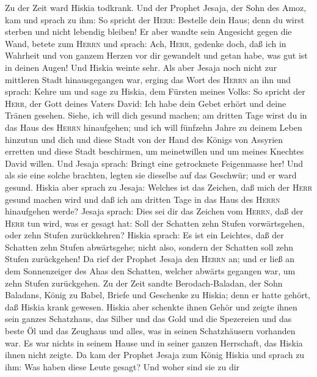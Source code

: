  Zu der Zeit ward Hiskia todkrank. Und der Prophet Jesaja,
der Sohn des Amoz, kam und sprach zu ihm: So spricht der \textsc{Herr}:
Bestelle dein Haus; denn du wirst sterben und nicht lebendig bleiben!
 Er aber wandte sein Angesicht gegen die Wand, betete zum
\textsc{Herrn} und sprach:  Ach, \textsc{Herr}, gedenke
doch, daß ich in Wahrheit und von ganzem Herzen vor dir gewandelt und
getan habe, was gut ist in deinen Augen!  Und Hiskia
weinte sehr. Als aber Jesaja noch nicht zur mittleren Stadt
hinausgegangen war, erging das Wort des \textsc{Herrn} an ihn und
sprach:  Kehre um und sage zu Hiskia, dem Fürsten meines
Volks: So spricht der \textsc{Herr}, der Gott deines Vaters David: Ich
habe dein Gebet erhört und deine Tränen gesehen. Siehe, ich will dich
gesund machen; am dritten Tage wirst du in das Haus des \textsc{Herrn}
hinaufgehen;  und ich will fünfzehn Jahre zu deinem Leben
hinzutun und dich und diese Stadt von der Hand des Königs von Assyrien
erretten und diese Stadt beschirmen, um meinetwillen und um meines
Knechtes David willen.  Und Jesaja sprach: Bringt eine
getrocknete Feigenmasse her! Und als sie eine solche brachten, legten
sie dieselbe auf das Geschwür; und er ward gesund.  Hiskia
aber sprach zu Jesaja: Welches ist das Zeichen, daß mich der
\textsc{Herr} gesund machen wird und daß ich am dritten Tage in das Haus
des \textsc{Herrn} hinaufgehen werde?  Jesaja sprach: Dies
sei dir das Zeichen vom \textsc{Herrn}, daß der \textsc{Herr} tun wird,
was er gesagt hat: Soll der Schatten zehn Stufen vorwärtsgehen, oder
zehn Stufen zurückkehren?  Hiskia sprach: Es ist ein
Leichtes, daß der Schatten zehn Stufen abwärtsgehe; nicht also, sondern
der Schatten soll zehn Stufen zurückgehen!  Da rief der
Prophet Jesaja den \textsc{Herrn} an; und er ließ an dem Sonnenzeiger
des Ahas den Schatten, welcher abwärts gegangen war, um zehn Stufen
zurückgehen.  Zu der Zeit sandte Berodach-Baladan, der
Sohn Baladans, König zu Babel, Briefe und Geschenke zu Hiskia; denn er
hatte gehört, daß Hiskia krank gewesen.  Hiskia aber
schenkte ihnen Gehör und zeigte ihnen sein ganzes Schatzhaus, das Silber
und das Gold und die Spezereien und das beste Öl und das Zeughaus und
alles, was in seinen Schatzhäusern vorhanden war. Es war nichts in
seinem Hause und in seiner ganzen Herrschaft, das Hiskia ihnen nicht
zeigte.  Da kam der Prophet Jesaja zum König Hiskia und
sprach zu ihm: Was haben diese Leute gesagt? Und woher sind sie zu dir
